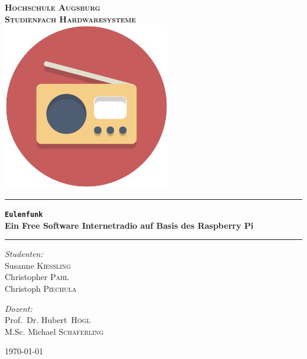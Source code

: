 \documentclass[11pt,ngerman,toc=listof,index=totoc]{scrreprt}
\date{\today}
\begin{document}
\begin{titlepage}
\pagecolor{titlepagecolor}
\begin{center}

\bf
\color{titlepagefontcolor}
\textsc{\huge Hochschule Augsburg}\\[1.5cm]
\textsc{\LARGE Studienfach Hardwaresysteme}\\[0.5cm]
\vspace{1em}
\includegraphics[width=0.55\textwidth]{images/title.png}~\\[1cm]

\rule{\linewidth}{0.5mm}
{\Huge \bfseries \frqq\texttt{Eulenfunk}\flqq \\ \Large{Ein Free Software
        Internetradio auf
Basis des Raspberry Pi}\\[0.4cm]}
\rule{\linewidth}{0.5mm}

\noindent
\begin{minipage}[t]{0.4\textwidth}
\begin{flushleft} \Large
\emph{Studenten:}\\
\textnormal{Susanne \textsc{Kießling}} \\
\textnormal{Christopher \textsc{Pahl}} \\
\textnormal{Christoph \textsc{Piechula}}
\end{flushleft}
\end{minipage}%
\begin{minipage}[t]{0.4\textwidth}
\begin{flushright} \Large
\emph{Dozent:} \\
\textnormal{Prof.\ Dr. Hubert\  \textsc{Högl}} \\
\textnormal{M.Sc. Michael \textsc{Schäferling}} 

\end{flushright}
\end{minipage}

\vfill

{\large \today}
\end{center}
\end{titlepage}
\nopagecolor
\end{document}
